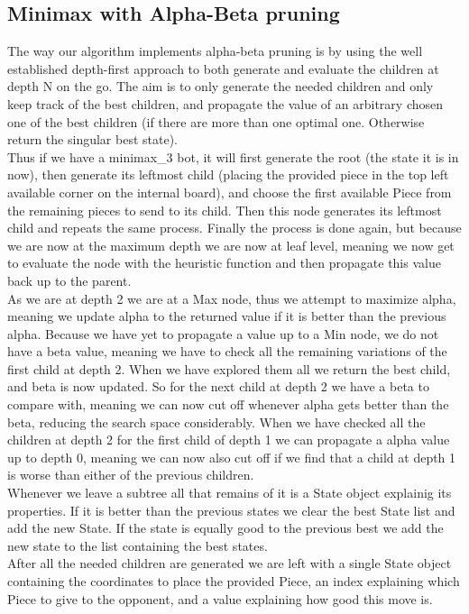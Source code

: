 \documentclass[12pt, a4paper]{article}
\begin{document}
\subsection{Minimax with Alpha-Beta pruning}
The way our algorithm implements alpha-beta pruning is by using the well established depth-first approach to both generate and evaluate the children at depth N on the go. The aim is to only generate the needed children and only keep track of the best children, and propagate the value of an arbitrary chosen one of the best children (if there are more than one optimal one. Otherwise return the singular best state). \\ 
Thus if we have a minimax\_3 bot, it will first generate the root (the state it is in now), then generate its leftmost child (placing the provided piece in the top left available corner on the internal board), and choose the first available Piece from the remaining pieces to send to its child. Then this node generates its leftmost child and repeats the same process. Finally the process is done again, but because we are now at the maximum depth we are now at leaf level, meaning we now get to evaluate the node with the heuristic function and then propagate this value back up to the parent. \\
As we are at depth 2 we are at a Max node, thus we attempt to maximize alpha, meaning we update alpha to the returned value if it is better than the previous alpha. Because we have yet to propagate a value up to a Min node, we do not have a beta value, meaning we have to check all the remaining variations of the first child at depth 2. When we have explored them all we return the best child, and beta is now updated. So for the next child at depth 2 we have a beta to compare with, meaning we can now cut off whenever alpha gets better than the beta, reducing the search space considerably. When we have checked all the children at depth 2 for the first child of depth 1 we can propagate a alpha value up to depth 0, meaning we can now also cut off if we find that a child at depth 1 is worse than either of the previous children. \\
Whenever we leave a subtree all that remains of it is a State object explainig its properties. If it is better than the previous states we clear the best State list and add the new State. If the state is equally good to the previous best we add the new state to the list containing the best states. \\
After all the needed children are generated we are left with a single State object containing the coordinates to place the provided Piece, an index explaining which Piece to give to the opponent, and a value explaining how good this move is. 
\end{document}
